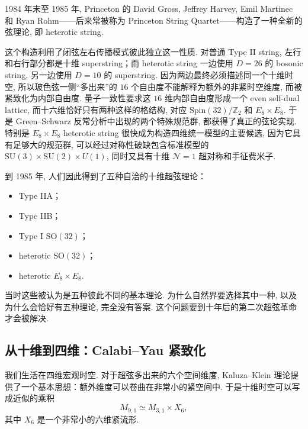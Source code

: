 \documentclass[10pt]{article}
\numberwithin{equation}{section}
\begin{document}
1984 年末至 1985 年, Princeton 的 David Gross, Jeffrey Harvey, Emil Martinec 和 Ryan Rohm——后来常被称为 Princeton String Quartet——构造了一种全新的弦理论, 即 heterotic string\cite{GrossHarveyMartinecRohm1985}. 

这个构造利用了闭弦左右传播模式彼此独立这一性质. 对普通 Type II string, 左行和右行部分都是十维 superstring；而 heterotic string 一边使用 $D=26$ 的 bosonic string, 另一边使用 $D=10$ 的 superstring. 因为两边最终必须描述同一个十维时空, 所以玻色弦一侧“多出来”的 $16$ 个自由度不能解释为额外的非紧时空维度, 而被紧致化为内部自由度. 量子一致性要求这 $16$ 维内部自由度形成一个 even self-dual lattice, 而十六维恰好只有两种这样的格结构, 对应 $\mathrm{Spin}(32)/\mathbb Z_2$ 和 $E_8\times E_8$. 于是 Green–Schwarz 反常分析中出现的两个特殊规范群, 都获得了真正的弦论实现. 特别是 $E_8\times E_8$ heterotic string 很快成为构造四维统一模型的主要候选, 因为它具有足够大的规范群, 可以经过对称性破缺包含标准模型的$\mathrm{SU}(3)\times \mathrm{SU}(2)\times U(1)$, 同时又具有十维 $\mathcal N=1$ 超对称和手征费米子. 

到 1985 年, 人们因此得到了五种自洽的十维超弦理论：
\begin{itemize}
  \item Type IIA；
  \item Type IIB；
  \item Type I $\mathrm{SO}(32)$；
  \item heterotic $\mathrm{SO}(32)$；
  \item heterotic $E_8\times E_8$. 
\end{itemize}


当时这些被认为是五种彼此不同的基本理论. 为什么自然界要选择其中一种, 以及为什么会恰好有五种理论, 完全没有答案. 这个问题要到十年后的第二次超弦革命才会被解决. 

\subsection{从十维到四维：Calabi–Yau 紧致化}

我们生活在四维宏观时空. 对于超弦多出来的六个空间维度, Kaluza–Klein 理论提供了一个基本思想：额外维度可以卷曲在非常小的紧空间中. 于是十维时空可以写成近似的乘积
\begin{equation} 
M_{9,1}\simeq M_{3,1}\times X_6,
\end{equation}
其中 $X_6$ 是一个非常小的六维紧流形.
\end{document}
